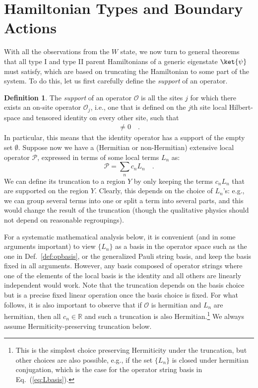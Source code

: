 \documentclass[prx,letterpaper,aps,superscriptaddress,floatfix,twocolumn,nofootinbib]{revtex4-2}
\theoremstyle{definition}
\newtheorem{defin}{Definition}
\begin{document}
\section{Hamiltonian Types and Boundary Actions}
\label{sec:generalQMBS}
%
With all the observations from the $W$ state, we now turn to general theorems that all type I and type II parent Hamiltonians of a generic eigenstate $\ket{\psi}$ must satisfy, which are based on truncating the Hamiltonian to some part of the system.
%
To do this, let us first carefully define the \textit{support} of an operator.
\begin{defin}
    The \textit{support} of an operator $\mathcal{O}$ is all the sites $j$ for which there exists an on-site operator $\mathcal{O}_j$, i.e., one that is defined on the $j$th site local Hilbert-space and tensored identity on every other site, such that
    \begin{align}
        [\mathcal{O},\mathcal{O}_j]\neq 0\quad.
    \end{align}
    In particular, this means that the identity operator has a support of the empty set $\emptyset$. 
    Suppose now we have a (Hermitian or non-Hermitian) extensive local operator $\mathcal{P}$, expressed in terms of some local terms $L_n$ as:
\begin{equation}
    \mathcal{P} = \sum_{n}c_n L_n\quad.
\end{equation}
We can define its truncation to a region $Y$ by only keeping the terms $c_n L_n$ that are supported on the region $Y$.
%
Clearly, this depends on the choice of $L_n$'s: e.g., we can group several terms into one or split a term into several parts, and this would change the result of the truncation (though the qualitative physics should not depend on reasonable regroupings).
%

%
For a systematic mathematical analysis below, it is convenient (and in some arguments important) to view $\{L_n\}$ as a basis in the operator space such as the one in Def.~\ref{def:opbasis}, or the generalized Pauli string basis, and keep the basis fixed in all arguments.
%
However, any basis composed of operator strings where one of the elements of the local basis is the identity and all others are linearly independent would work.
%
Note that the truncation depends on the basis choice but is a precise fixed linear operation once the basis choice is fixed.
%
For what follows, it is also important to observe that if $\mathcal{O}$ is hermitian and $L_n$ are hermitian, then all $c_n \in \mathbb{R}$ and such a truncation is also Hermitian.\footnote{This is the simplest choice preserving Hermiticity under the truncation, but other choices are also possible, e.g., if the set $\{L_n\}$ is closed under hermitian conjugation, which is the case for the operator string basis in Eq.~(\ref{eq:Lbasis}).}
We always assume Hermiticity-preserving truncation below.
%
\end{defin}
%
\end{document}
